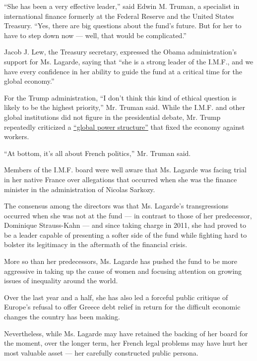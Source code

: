 ``She has been a very effective leader,'' said Edwin M. Truman, a
specialist in international finance formerly at the Federal Reserve and
the United States Treasury. ``Yes, there are big questions about the
fund's future. But for her to have to step down now --- well, that would
be complicated.''

Jacob J. Lew, the Treasury secretary, expressed the Obama
administration's support for Ms. Lagarde, saying that ``she is a strong
leader of the I.M.F., and we have every confidence in her ability to
guide the fund at a critical time for the global economy.''

For the Trump administration, ``I don't think this kind of ethical
question is likely to be the highest priority,'' Mr. Truman said. While
the I.M.F. and other global institutions did not figure in the
presidential debate, Mr. Trump repeatedly criticized a
\href{http://www.nytimes3xbfgragh.onion/2016/10/14/us/politics/trump-comments-linked-to-antisemitism.html?_r=0}{``global
power structure''} that fixed the economy against workers.

``At bottom, it's all about French politics,'' Mr. Truman said.

Members of the I.M.F. board were well aware that Ms. Lagarde was facing
trial in her native France over allegations that occurred when she was
the finance minister in the administration of Nicolas Sarkozy.

The consensus among the directors was that Ms. Lagarde's transgressions
occurred when she was not at the fund --- in contrast to those of her
predecessor, Dominique Strauss-Kahn --- and since taking charge in 2011,
she had proved to be a leader capable of presenting a softer side of the
fund while fighting hard to bolster its legitimacy in the aftermath of
the financial crisis.

More so than her predecessors, Ms. Lagarde has pushed the fund to be
more aggressive in taking up the cause of women and focusing attention
on growing issues of inequality around the world.

Over the last year and a half, she has also led a forceful public
critique of Europe's refusal to offer Greece debt relief in return for
the difficult economic changes the country has been making.

Nevertheless, while Ms. Lagarde may have retained the backing of her
board for the moment, over the longer term, her French legal problems
may have hurt her most valuable asset --- her carefully constructed
public persona.

